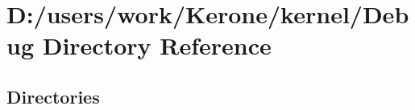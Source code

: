 \section{D\+:/users/work/\+Kerone/kernel/\+Debug Directory Reference}
\label{dir_1d152523126c4d853f5c35de2652081b}
\subsection*{Directories}
\begin{DoxyCompactItemize}
\end{DoxyCompactItemize}
